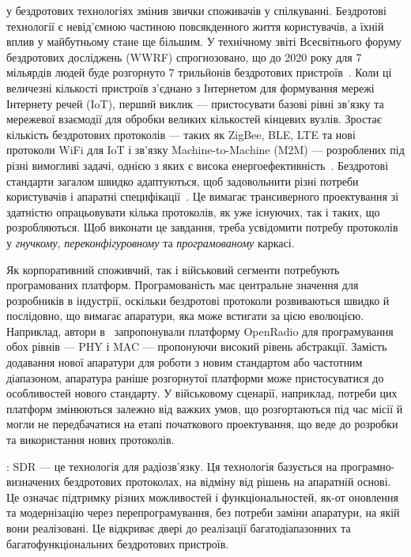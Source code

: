 \documentclass[journal]{IEEEtran}
\begin{document}
 у бездротових технологіях змінив звички споживачів у спілкуванні. Бездротові технології є невід'ємною частиною повсякденного життя користувачів, а їхній вплив у майбутньому стане ще більшим. У технічному звіті Всесвітнього форуму бездротових досліджень (WWRF) спрогнозовано, що до 2020 року для 7 мільярдів людей буде розгорнуто 7 трильйонів бездротових пристроїв~\cite{wwrf09}. Коли ці величезні кількості пристроїв з'єднано з Інтернетом для формування мережі Інтернету речей (IoT), перший виклик — пристосувати базові рівні зв'язку та мережевої взаємодії для обробки великих кількостей кінцевих вузлів. Зростає кількість бездротових протоколів — таких як ZigBee, BLE, LTE та нові протоколи WiFi для IoT і зв'язку Machine-to-Machine (M2M) — розроблених під різні вимогливі задачі, однією з яких є висока енергоефективність~\cite{Al-Fuqaha2015}. Бездротові стандарти загалом швидко адаптуються, щоб задовольнити різні потреби користувачів і апаратні специфікації~\cite{IEEE,3GPP}. Це вимагає трансиверного проектування зі здатністю опрацьовувати кілька протоколів, як уже існуючих, так і таких, що розробляються. Щоб виконати це завдання, треба усвідомити потребу протоколів у \textit{гнучкому}, \textit{переконфігуровному} та \textit{програмованому} каркасі.

Як корпоративний споживчий, так і військовий сегменти потребують програмованих платформ. Програмованість має центральне значення для розробників в індустрії, оскільки бездротові протоколи розвиваються швидко й послідовно, що вимагає апаратури, яка може встигати за цією еволюцією. Наприклад, автори в~\cite{Bansal2012} запропонували платформу OpenRadio для програмування обох рівнів — PHY і MAC — пропонуючи високий рівень абстракції. Замість додавання нової апаратури для роботи з новим стандартом або частотним діапазоном, апаратура раніше розгорнутої платформи може пристосуватися до особливостей нового стандарту. У військовому сценарії, наприклад, потреби цих платформ змінюються залежно від важких умов, що розгортаються під час місії й могли не передбачатися на етапі початкового проектування, що веде до розробки та використання нових протоколів.

: SDR — це технологія для радіозв'язку. Ця технологія базується на програмно-визначених бездротових протоколах, на відміну від рішень на апаратній основі. Це означає підтримку різних можливостей і функціональностей, як-от оновлення та модернізацію через перепрограмування, без потреби заміни апаратури, на якій вони реалізовані. Це відкриває двері до реалізації багатодіапазонних та багатофункціональних бездротових пристроїв.
\end{document}
